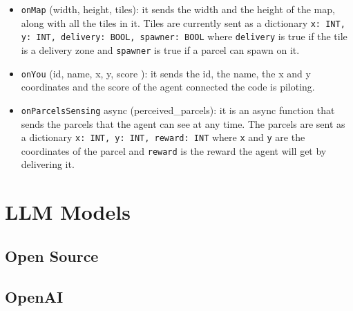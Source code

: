 \begin{itemize}
  \item \texttt{onMap} (width, height, tiles): it sends the width and the height
    of the map, along with all the tiles in it. Tiles are currently sent as a dictionary
    \texttt{x: INT, y: INT, delivery: BOOL, spawner: BOOL} where \texttt{delivery}
    is true if the tile is a delivery zone and \texttt{spawner} is true if a
    parcel can spawn on it.

  \item \texttt{onYou} (id, name, x, y, score ): it sends the id, the name, the
    x and y coordinates and the score of the agent connected the code is
    piloting.

  \item \texttt{onParcelsSensing} async (perceived\_parcels): it is an async function
    that sends the parcels that the agent can see at any time. The parcels are
    sent as a dictionary \texttt{x: INT, y: INT, reward: INT} where \texttt{x}
    and \texttt{y} are the coordinates of the parcel and \texttt{reward} is the
    reward the agent will get by delivering it.
\end{itemize}

\section{LLM Models}
\label{sec:llm_models}

\subsection{Open Source}

\subsection{OpenAI}